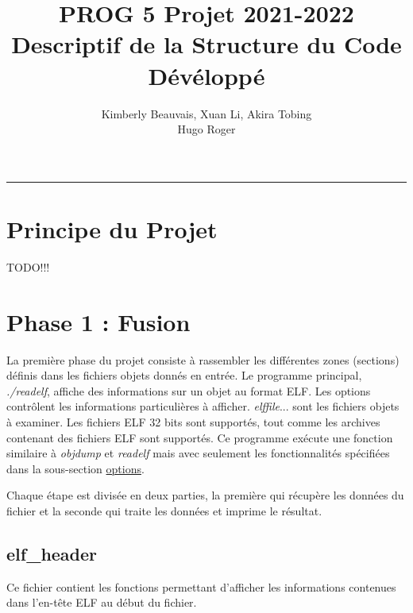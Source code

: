 \documentclass[a4paper]{article} %
\title{PROG 5 Projet 2021-2022 \\
\large Descriptif de la Structure du Code Dévéloppé}
\author{Kimberly Beauvais, Xuan Li, Akira Tobing \\
Hugo Roger}
\begin{document}
\maketitle
\begin{center}
\rule{\textwidth}{1pt}
\end{center}

\renewcommand{\contentsname}{Table des Matières}
\tableofcontents

\newpage


\section*{Principe du Projet}

TODO!!!


\section{Phase 1 : Fusion }
\label{sec:phase1}
La première phase du projet consiste à rassembler les différentes zones (sections)
définis dans les fichiers objets donnés en entrée. Le programme principal, \textit{./readelf}, 
affiche des informations sur un objet au format ELF.  Les options contrôlent les 
informations particulières à afficher. \textit{elffile}... sont les fichiers 
objets à examiner.  Les fichiers ELF 32 bits sont supportés, tout comme les 
archives contenant des fichiers ELF sont supportés. Ce programme exécute une 
fonction similaire à \textit{objdump} et \textit{readelf} mais avec seulement 
les fonctionnalités spécifiées dans la sous-section \hyperref[sec:options]{options}. 


Chaque étape est divisée en deux parties, la première qui récupère les données 
du fichier et la seconde qui traite les données et imprime le résultat.


\subsection{elf\_header}
\label{sec:elfheader}
\noindent Ce fichier contient les fonctions permettant d'afficher les informations 
contenues dans l'en-tête ELF au début du fichier.
\end{document}
